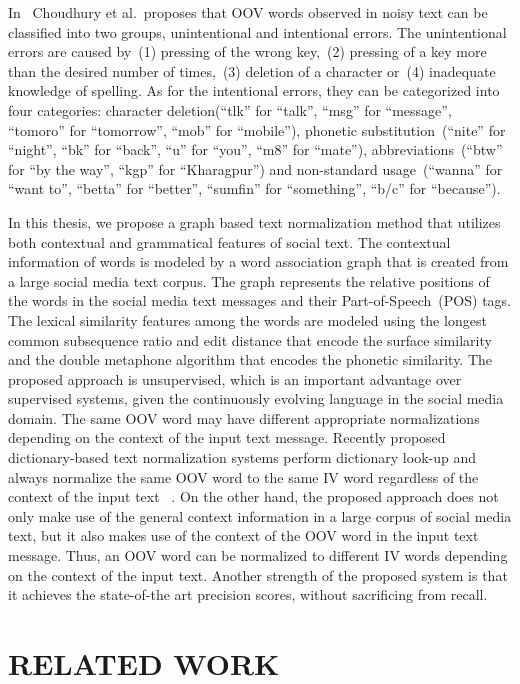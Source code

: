 \documentclass[a4paper,onesided,12pt]{report}
\begin{document}
In~\cite{Choudhury:2007:IMS:1326044.1326048} Choudhury et al.~proposes that OOV words observed in noisy text can be classified into two groups, unintentional and intentional errors. The unintentional errors are caused by~(1) pressing of the wrong key,~(2) pressing of a key more than the desired number of times,~(3) deletion of a character or~(4) inadequate knowledge of spelling. As for the intentional errors, they can be categorized into four categories: character deletion(``tlk'' for ``talk'', ``msg'' for ``message'', ``tomoro'' for ``tomorrow'', ``mob'' for ``mobile''), phonetic substitution~(``nite'' for ``night'', ``bk'' for ``back'', ``u'' for ``you'', ``m8'' for ``mate''), abbreviations~(``btw'' for ``by the way'', ``kgp'' for ``Kharagpur'') and non-standard usage~(``wanna'' for ``want to'', ``betta'' for ``better'', ``sumfin'' for ``something'', ``b/c'' for ``because'').

In this thesis, we propose a graph based text normalization method that utilizes both contextual and grammatical features of social text. The contextual information of words is modeled by a word association graph that is created from a large social media text corpus. The graph represents the relative positions of the words in the social media text messages and their Part-of-Speech~(POS) tags. The lexical similarity features among the words are modeled using the longest common subsequence ratio and edit distance that encode the surface similarity and the double metaphone algorithm that encodes the phonetic similarity. The proposed approach is unsupervised, which is an important advantage over supervised systems, given the continuously evolving language in the social media domain. The same OOV word may have different appropriate normalizations depending on the context of the input text message. Recently proposed dictionary-based text normalization systems perform dictionary look-up and always normalize the same OOV word to the same IV word regardless of the context of the input text ~\cite{Han:2011:LNS:2002472.2002520,DBLP:conf/acl/HassanM13}. On the other hand, the proposed approach does not only make use of the general context information in a large corpus of social media text, but it also makes use of the context of the OOV word in the input text message. Thus, an OOV word can be normalized to different IV words depending on the context of the input text. Another strength of the proposed system is that it achieves the state-of-the art precision scores, without sacrificing from recall.

\chapter{RELATED WORK}
\label{chapter:related}
\end{document}
